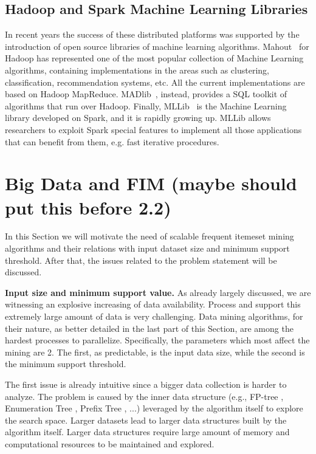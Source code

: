 \subsection{Hadoop and Spark Machine Learning Libraries}
In recent years the
success of these distributed platforms was supported by the introduction of open
source libraries of machine learning algorithms.
Mahout~\cite{Mahout} for Hadoop has represented one of the most popular
collection of Machine Learning algorithms, containing implementations in the
areas such as clustering, classification, recommendation systems, etc. All the
current implementations are based on Hadoop MapReduce.
MADlib~\cite{madlib},
instead, provides a SQL toolkit of algorithms that run over Hadoop. Finally,
MLLib~\cite{MLLib} is the Machine Learning library developed on Spark, and it is
rapidly growing up. MLLib allows researchers to exploit Spark special features
to implement all those applications that can benefit from them, e.g. fast
iterative procedures.

\section{Big Data and FIM (maybe should put this before 2.2)}
In this Section we will motivate the need of scalable frequent itemeset mining algorithms and their relations with input dataset size and
minimum support threshold. After that, the issues related to the problem statement will be discussed.

\textbf{Input size and minimum support value.} As already largely discussed, we are witnessing an explosive increasing of data availability. Process and support this extremely large amount of data is very challenging. Data mining algorithms, for their nature, as better detailed in the last part of this Section, are among the hardest processes to parallelize. Specifically, the parameters which most affect the mining are 2. The first, as predictable, is the input data size, while the second is the minimum support threshold. 

The first issue is already intuitive since a bigger data collection is harder to analyze. The problem is caused by the inner data structure (e.g., FP-tree \cite{Han00}, Enumeration Tree \cite{Zaki_Carpenter}, Prefix Tree \cite{Zaki97newalgorithms}, ...) leveraged by the algorithm itself to explore the search space. Larger datasets lead to larger data structures built by the algorithm itself. Larger data structures require large amount of memory and computational resources to be maintained and explored.

